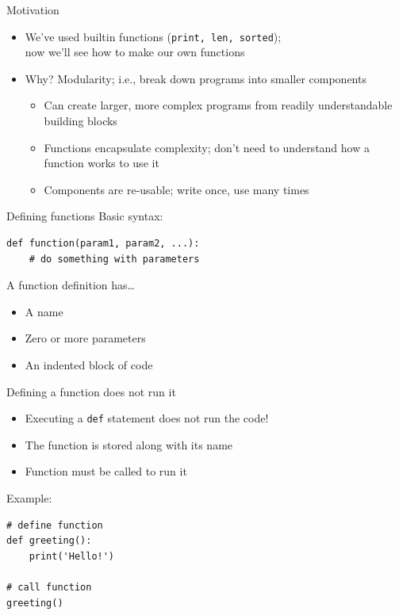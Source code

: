 \documentclass[aspectratio=169,usenames,dvipsnames]{beamer}
\begin{document}
\begin{frame}{Motivation}
    \begin{itemize}
        \item We've used builtin functions (\texttt{print, len, sorted});\\
            now we'll see how to make our own functions
        \item Why? Modularity; i.e., break down programs into smaller components
            \begin{itemize}
                \item Can create larger, more complex programs
                    from readily understandable building blocks
                \item Functions encapsulate complexity;
                    don't need to understand how a function works to use it
                \item Components are re-usable;
                    write once, use many times
            \end{itemize}
    \end{itemize}
\end{frame}

\begin{frame}[fragile]{Defining functions}
Basic syntax:
\begin{lstlisting}
def function(param1, param2, ...):
    # do something with parameters
\end{lstlisting}

    A function definition has\dots
    \begin{itemize}
        \item A name
        \item Zero or more parameters
        \item An indented block of code
    \end{itemize}
\end{frame}

\begin{frame}[fragile]{Defining a function does not run it}
    \begin{itemize}
        \item Executing a \texttt{def} statement does not run the code!
        \item The function is stored along with its name
        \item Function must be called to run it
    \end{itemize}
    Example:
\begin{lstlisting}
# define function
def greeting():
    print('Hello!')

# call function
greeting()
\end{lstlisting}
\end{frame}
\end{document}

